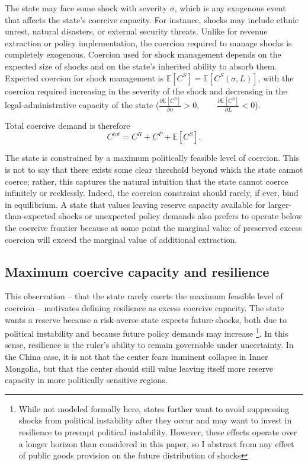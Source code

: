 \documentclass[12pt]{article}
\newcommand{\E}{\mathbb{E}}
\begin{document}
The state may face some shock with severity $\sigma$, which is any exogenous event that affects the state's coercive capacity. For instance, shocks may include ethnic unrest, natural disasters, or external security threats. Unlike for revenue extraction or policy implementation, the coercion required to manage shocks is completely exogenous. Coercion used for shock management depends on the expected size of shocks and on the state's inherited ability to absorb them. Expected coercion for shock management is $\E[C^S] = \E[C^S(\sigma,L)]$, with the coercion required increasing in the severity of the shock and decreasing in the legal-administrative capacity of the state ($\frac{\partial \E[C^S]}{\partial \sigma} > 0, \qquad \frac{\partial \E[C^S]}{\partial L} < 0$).

Total coercive demand is therefore
\begin{equation}
C^{tot} = C^R + C^P + \E[C^S].
\end{equation}

The state is constrained by a maximum politically feasible level of coercion. This is not to say that there exists some clear threshold beyond which the state cannot coerce; rather, this captures the natural intuition that the state cannot coerce infinitely or recklessly. Indeed, the coercion constraint should rarely, if ever, bind in equilibrium. A state that values leaving reserve capacity available for larger-than-expected shocks or unexpected policy demands also prefers to operate below the coercive frontier because at some point the marginal value of preserved excess coercion will exceed the marginal value of additional extraction.

\subsection{Maximum coercive capacity and resilience}

This observation -- that the state rarely exerts the maximum feasible level of coercion -- motivates defining resilience as excess coercive capacity. The state wants a reserve because a risk-averse state expects future shocks, both due to political instability and because future policy demands may increase \footnote{While not modeled formally here, states further want to avoid suppressing shocks from political instability after they occur and may want to invest in resilience to preempt political instability. However, these effects operate over a longer horizon than considered in this paper, so I abstract from any effect of public goods provision on the future distribution of shocks}. In this sense, resilience is the ruler's ability to remain governable under uncertainty. In the China case, it is not that the center fears imminent collapse in Inner Mongolia, but that the center should still value leaving itself more reserve capacity in more politically sensitive regions.
\end{document}
